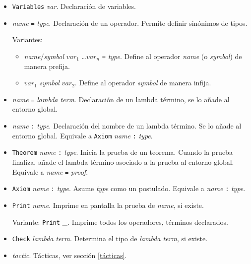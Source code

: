 \documentclass[a4paper,11pt]{article}
\theoremstyle{definition}
\theoremstyle{remark}
\begin{document}
\begin{itemize}

\item \texttt{Variables} \textit{var}. Declaración de variables.
\item \textit{name} \texttt{=} \textit{type}. Declaración de un operador.
  Permite definir sinónimos de tipos. 

  Variantes:
  \begin{itemize}
  \item \textit{name}/\textit{symbol} $var_1$ \ldots $var_n$ \texttt{=} \textit{type}.
    Define al operador \textit{name} (o \textit{symbol}) de manera prefija. 
  \item $var_1$ \textit{symbol} $var_2$. Define al operador \textit{symbol} de manera infija.

  \end{itemize}

\item \textit{name} \texttt{=} \textit{lambda term}. Declaración de un lambda término,
se lo añade al entorno global.

\item \textit{name} \texttt{:} \textit{type}. Declaración del nombre de un lambda término. 
Se lo añade al entorno global. Equivale a \texttt{Axiom} \textit{name} \texttt{:} \textit{type}.

\item \texttt{Theorem} \textit{name} \texttt{:} \textit{type}. Inicia la prueba de un
teorema. Cuando la prueba finaliza, añade el lambda término asociado a la prueba al entorno global.
Equivale a \textit{name} \texttt{=} \textit{proof}.


\item \texttt{Axiom} \textit{name} \texttt{:} \textit{type}. Asume \textit{type} como un postulado.
Equivale a \textit{name} \texttt{:} \textit{type}.

\item \texttt{Print} \textit{name}. Imprime en pantalla la prueba de \textit{name}, si existe.

Variante:
\texttt{Print} \_. Imprime todos los operadores, términos declarados.

\item \texttt{Check} \textit{lambda term}. Determina el tipo de \textit{lambda term}, si existe.

\item \textit{tactic}. Tácticas, ver sección \ref{tácticas}.

\end{itemize}
\end{document}
